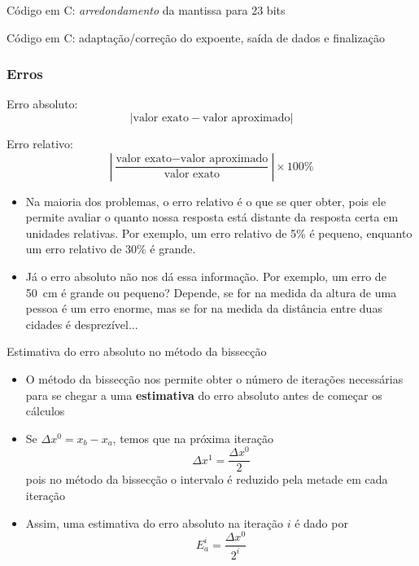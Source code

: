 \begin{frame}{Código em C: \textit{arredondamento} da mantissa para 23 bits}
    
\end{frame}

\begin{frame}{Código em C: adaptação/correção do expoente, saída de dados e finalização}
    
\end{frame}

\begin{frame}
    \frametitle{Erros}
    Erro absoluto: 
    \[
        \left| \text{valor exato} - \text{valor aproximado} \right|
    \]

    Erro relativo: 
    \[
        \left| \frac{\text{valor exato} - \text{valor aproximado}}{\text{valor exato}}  \right|\times 100\%
    \]
    \begin{block}
        {}
        \begin{itemize}
            \item Na maioria dos problemas, o erro relativo é o que se quer obter, pois ele permite avaliar o quanto nossa resposta está distante da resposta certa em unidades relativas. Por exemplo, um erro relativo de 5\% é pequeno, enquanto um erro relativo de 30\% é grande. 
            \item Já o erro absoluto não nos dá essa informação. Por exemplo, um erro de \SI{50}{cm} é grande ou pequeno? Depende, se for na medida da altura de uma pessoa é um erro enorme, mas se for na medida da distância entre duas cidades é desprezível...
        \end{itemize}
    \end{block}
\end{frame}

\begin{frame}{Estimativa do erro absoluto no método da bissecção}
    \begin{itemize}
        \item O método da bissecção nos permite obter o número de iterações
            necessárias para se chegar a uma \textbf{estimativa} do
            erro absoluto antes de começar os cálculos

        \item Se $\Delta x^0=x_b-x_a$, temos que na próxima iteração 
            \[ 
                \Delta x^1=\frac{\Delta x^0}{2}
            \]
            pois no método da bissecção o intervalo é reduzido pela metade em cada iteração

        \item Assim, uma estimativa do erro absoluto na iteração $i$ é dado por 
            \[
                E^i_a = \frac{\Delta x^0}{2^i}
            \]
    \end{itemize}
\end{frame}

